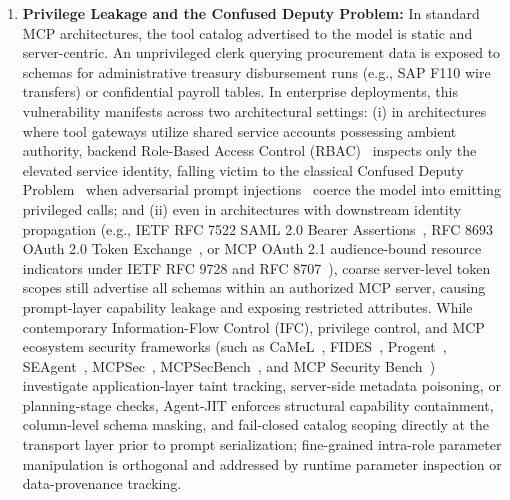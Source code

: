 \documentclass[conference,10pt]{IEEEtran}
\begin{document}
\begin{enumerate}
    \item \textbf{Privilege Leakage and the Confused Deputy Problem:} In standard MCP architectures, the tool catalog advertised to the model is static and server-centric. An unprivileged clerk querying procurement data is exposed to schemas for administrative treasury disbursement runs (e.g., SAP F110 wire transfers) or confidential payroll tables. In enterprise deployments, this vulnerability manifests across two architectural settings: (i) in architectures where tool gateways utilize shared service accounts possessing ambient authority, backend Role-Based Access Control (RBAC)~\cite{sandhu1996rbac} inspects only the elevated service identity, falling victim to the classical Confused Deputy Problem~\cite{hardy1988confused} when adversarial prompt injections~\cite{greshake2023promptinjection, zhan2024injecagent} coerce the model into emitting privileged calls; and (ii) even in architectures with downstream identity propagation (e.g., IETF RFC 7522 SAML 2.0 Bearer Assertions~\cite{jones2015rfc7522}, RFC 8693 OAuth 2.0 Token Exchange~\cite{jones2020rfc8693}, or MCP OAuth 2.1 audience-bound resource indicators under IETF RFC 9728 and RFC 8707~\cite{anthropic2024mcp}), coarse server-level token scopes still advertise all schemas within an authorized MCP server, causing prompt-layer capability leakage and exposing restricted attributes. While contemporary Information-Flow Control (IFC), privilege control, and MCP ecosystem security frameworks (such as CaMeL~\cite{debenedetti2025camel}, FIDES~\cite{costa2025fides}, Progent~\cite{shi2025progent}, SEAgent~\cite{ji2026seagent}, MCPSec~\cite{maloyan2026mcpsec}, MCPSecBench~\cite{yang2025mcpsecbench}, and MCP Security Bench~\cite{zhang2026msb}) investigate application-layer taint tracking, server-side metadata poisoning, or planning-stage checks, Agent-JIT enforces structural capability containment, column-level schema masking, and fail-closed catalog scoping directly at the transport layer prior to prompt serialization; fine-grained intra-role parameter manipulation is orthogonal and addressed by runtime parameter inspection or data-provenance tracking.

\end{enumerate}
\end{document}
